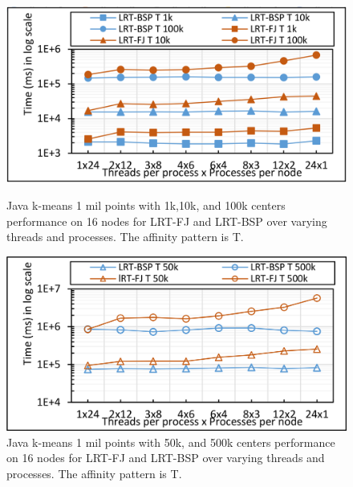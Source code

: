 \documentclass[10pt, conference, compsocconf]{IEEEtran}
\begin{document}
\begin{figure}[!htb]
	\begin{minipage}{0.49\textwidth}
        \centering
        \includegraphics[width=1\columnwidth]{images/fig_kmeans_1mil_varying_centers_by_10k_FJ_vs_BSP_T}
        \caption{Java k-means 1 mil points with 1k,10k, and 100k centers performance on 16 nodes for \ac{LRT-FJ} and \ac{LRT-BSP} over varying threads and processes. The affinity pattern is T.}
        \label{fig:fig_kmeans_1mil_varying_centers_by_10k_FJ_vs_BSP_T}
    \end{minipage}
    \hspace{1.4mm}
    \begin{minipage}{0.49\textwidth}
        \centering
        \includegraphics[width=1\columnwidth]{images/fig_kmeans_1mil_varying_centers_as_50k_500k_FJ_vs_BSP_T}
        \caption{Java k-means 1 mil points with 50k, and 500k centers performance on 16 nodes for \ac{LRT-FJ} and \ac{LRT-BSP} over varying threads and processes. The affinity pattern is T.}
        \label{fig:fig_kmeans_1mil_varying_centers_as_50k_500k_FJ_vs_BSP_T}
    \end{minipage}
\end{figure}
\end{document}

